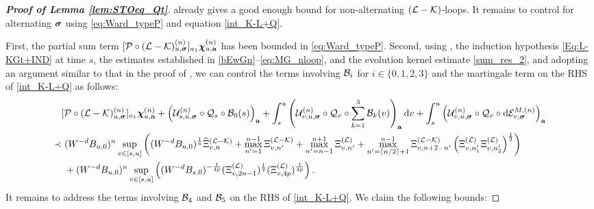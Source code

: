 \begin{proof}[\bf Proof of Lemma \ref{lem:STOeq_Qt}] %
 already gives a good enough bound for non-alternating $(\cL-\cK)$-loops. It remains to control  for alternating $\bsig$ using \eqref{eq:Ward_typeP} and equation \eqref{int_K-L+Q}. 

First, the partial sum term \([\cal P\circ (\mathcal{L} - \mathcal{K})^{(n)}_{u, \bsig}]_{a_1} \dthn^{(n)}_{u, \ba}\) has been bounded in \eqref{eq:Ward_typeP}. Second, using  , the induction hypothesis \eqref{Eq:L-KGt+IND} at time $s$, the estimates established in \eqref{bEwGn}--\eqref{eq:MG_nloop}, and the evolution kernel estimate \eqref{sum_res_2}, and adopting an argument similar to that in the proof of , we can control the terms involving $\cal B_{i}$ for $i\in \{0,1,2,3\}$ and the martingale term on the RHS of \eqref{int_K-L+Q} as follows:
\begin{align}
&  [\cal P\circ (\mathcal{L} - \mathcal{K})^{(n)}_{u, \bsig}]_{a_1} \dthn^{(n)}_{u, \ba}+ \left(\mathcal{U}^{(n)}_{s, u, \bsig} \circ  {\cal Q}_s\circ  {\cal B}_0(s)\right)_{\ba} +  \int_{s}^u \left(\mathcal{U}^{(n)}_{v, u, \bsig} \circ  {\cal Q}_v\circ \sum_{k=1}^3{\cal B}_k(v)  \right)_{\ba} \dd v + \int_{s}^u \left(\mathcal{U}^{(n)}_{v, u, \bsig} \circ  {\cal Q}_v\circ \dd\mathcal{E}^{M,(n)}_{v, \bsig}\right)_{\ba} \nonumber\\
\prec&~  (W^{-d}B_{u,0})^n \sup_{v\in [s,u]}
  \left((W^{-d}B_{u,0})^{\frac{1}{6}}\wh\Xi^{(\cal L-\cK)}_{v, n}+ \max_{n'=1}^{n-1} \Xi^{({\cal L-\cal K})}_{v,n'}+ \max_{n'=n-1}^{n+1} \Xi^{({\cal L})}_{v,n'} +\max_{n'=\lceil n/2\rceil + 1}^{n-1} \Xi^{({\cal L-\cal K})}_{v,n+2-n'} \p{\Xi^{({\cal L})}_{v,n_1'} \Xi^{({\cal L})}_{v,n_2'}}^{\frac 12 } \right) \nonumber\\
&~+ (W^{-d}B_{u,0})^n \sup_{v\in[s,u]} \left((W^{-d}B_{s,0})^{-\frac{1}{4p}}(\Xi^{(\cal L)}_{v, {2n-1}})^{\frac 1 2}(\Xi^{(\cal L)}_{v, 4p})^{\frac{1}{4p}}\right) .\label{eq:alternatecase1}
\end{align}
It remains to address the terms involving $\cal B_{4}$ and $\cal B_{5}$ on the RHS of \eqref{int_K-L+Q}. We claim the following bounds: %

\end{proof}

